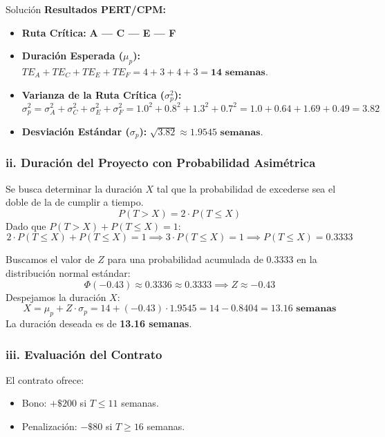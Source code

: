 \documentclass[11pt, a4paper]{article}
\begin{document}
\begin{ejercicio}{Solución}
  \textbf{Resultados PERT/CPM:}
  \begin{itemize}
    \item \textbf{Ruta Crítica:} \textbf{A --- C --- E --- F}
    \item \textbf{Duración Esperada ($\mu_p$):} $TE_A + TE_C + TE_E + TE_F = 4 + 3 + 4 + 3 = \mathbf{14 \text{ semanas}}$.
    \item \textbf{Varianza de la Ruta Crítica ($\sigma_p^2$):}
      \begin{equation*}
        \sigma_p^2 = \sigma_A^2 + \sigma_C^2 + \sigma_E^2 + \sigma_F^2 = 1.0^2 + 0.8^2 + 1.3^2 + 0.7^2 = 1.0 + 0.64 + 1.69 + 0.49 = \mathbf{3.82}
      \end{equation*}
    \item \textbf{Desviación Estándar ($\sigma_p$):} $\sqrt{3.82} \approx \mathbf{1.9545 \text{ semanas}}$.
  \end{itemize}

  \subsubsection*{ii. Duración del Proyecto con Probabilidad Asimétrica}
  Se busca determinar la duración $X$ tal que la probabilidad de excederse sea el doble de la de cumplir a tiempo.
  \begin{equation*}
    P(T > X) = 2 \cdot P(T \le X)
  \end{equation*}
  Dado que $P(T > X) + P(T \le X) = 1$:
  \begin{equation*}
    2 \cdot P(T \le X) + P(T \le X) = 1 \implies 3 \cdot P(T \le X) = 1 \implies P(T \le X) = 0.3333
  \end{equation*}
  
  Buscamos el valor de $Z$ para una probabilidad acumulada de $0.3333$ en la distribución normal estándar:
  \begin{equation*}
    \Phi(-0.43) \approx 0.3336 \approx 0.3333 \implies Z \approx -0.43
  \end{equation*}
  Despejamos la duración $X$:
  \begin{equation*}
    X = \mu_p + Z \cdot \sigma_p = 14 + (-0.43) \cdot 1.9545 = 14 - 0.8404 = \mathbf{13.16 \text{ semanas}}
  \end{equation*}
  La duración deseada es de \textbf{13.16 semanas}.

  \subsubsection*{iii. Evaluación del Contrato}
  El contrato ofrece:
  \begin{itemize}
    \item Bono: $+\$200$ si $T \le 11$ semanas.
    \item Penalización: $-\$80$ si $T \ge 16$ semanas.
  \end{itemize}


\end{ejercicio}
\end{document}
